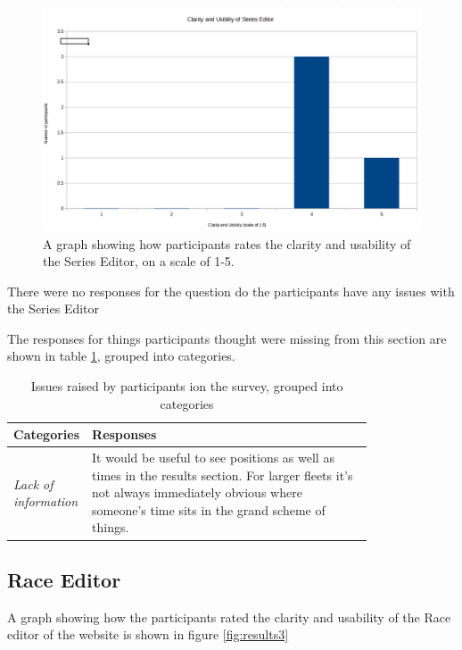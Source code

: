 \documentclass{l4proj}
\begin{document}
\begin{figure}[H]
    \centering
    \includegraphics[width=1\linewidth]{images/results 2.png} 

    \caption{A graph showing how participants rates the clarity and usability of the Series Editor, on a scale of 1-5.
    }

    \label{fig:results2}
\end{figure}

There were no responses for the question do the participants have any issues with the Series Editor

The responses for things participants thought were missing from this section are shown in table \ref{tab:table 2}, grouped into categories.

\begin{table}[H]
    \centering
    \caption{Issues raised by participants ion the survey, grouped into categories}
    \begin{tabular}{|l|p{0.8\linewidth}|}
    \hline
        \textbf{Categories} & \textbf{Responses}  \\ \hline
        \textit{Lack of information} & It would be useful to see positions as well as times in the results section. For larger fleets it's not always immediately obvious where someone's time sits in the grand scheme of things.  \\ \hline
    \end{tabular}
    \label{tab:table 2}
\end{table}

\subsection{Race Editor}
A graph showing how the participants rated the clarity and usability of the Race editor of the website is shown in figure \ref{fig:results3}
\end{document}
